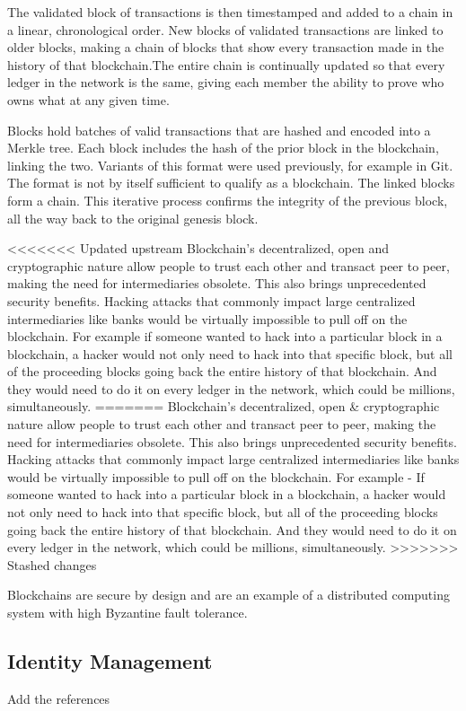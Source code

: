 The validated block of transactions is then timestamped and added to a chain in a linear, chronological order. New blocks of validated transactions are linked to older blocks, making a chain of blocks that show every transaction made in the history of that blockchain.The entire chain is continually updated so that every ledger in the network is the same, giving each member the ability to prove who owns what at any given time.

Blocks hold batches of valid transactions that are hashed and encoded into a Merkle tree. Each block includes the hash of the prior block in the blockchain, linking the two. Variants of this format were used previously, for example in Git. The format is not by itself sufficient to qualify as a blockchain. The linked blocks form a chain. This iterative process confirms the integrity of the previous block, all the way back to the original genesis block.

<<<<<<< Updated upstream
Blockchain’s decentralized, open and cryptographic nature allow people to trust each other and transact peer to peer, making the need for intermediaries obsolete. This also brings unprecedented security benefits. Hacking attacks that commonly impact large centralized intermediaries like banks would be virtually impossible to pull off on the blockchain. For example if someone wanted to hack into a particular block in a blockchain, a hacker would not only need to hack into that specific block, but all of the proceeding blocks going back the entire history of that blockchain. And they would need to do it on every ledger in the network, which could be millions, simultaneously.
=======
Blockchain’s decentralized, open \& cryptographic nature allow people to trust each other and transact peer to peer, making the need for intermediaries obsolete. This also brings unprecedented security benefits. Hacking attacks that commonly impact large centralized intermediaries like banks would be virtually impossible to pull off on the blockchain. For example - If someone wanted to hack into a particular block in a blockchain, a hacker would not only need to hack into that specific block, but all of the proceeding blocks going back the entire history of that blockchain. And they would need to do it on every ledger in the network, which could be millions, simultaneously.
>>>>>>> Stashed changes

Blockchains are secure by design and are an example of a distributed computing system with high Byzantine fault tolerance.

\subsection{Identity Management}
\begin{notation}
  Add the references
\end{notation}

